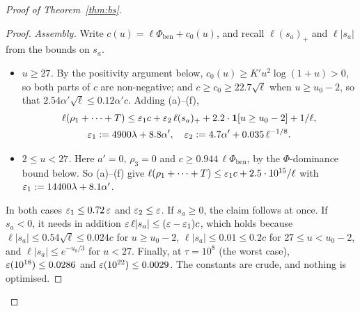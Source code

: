 \begin{proof}[Proof of Theorem~\ref{thm:bs}]
\begin{proof}
\emph{Assembly.} Write $c(u)=\ell\Phi_{\mathrm{ben}}+c_0(u)$, and recall $\ell(s_a)_+$ and $\ell|s_a|$ from the bounds on $s_a$.
\begin{itemize}
\item \emph{$u\ge27$.} By the positivity argument below, $c_0(u)\ge K'u^2\log(1+u)>0$, so both parts of $c$ are
  non-negative; and $c\ge c_0\ge22.7\sqrt\ell$ when $u\ge u_0-2$, so that $2.54\alpha'\sqrt\ell\le0.12\alpha'c$. Adding (a)--(f),
  \begin{gather*}
    \ell(\rho_1+\cdots+T)\le\varepsilon_1c+\varepsilon_2\,\ell(s_a)_++2.2\cdot\mathbf 1[u\ge u_0-2]+1/\ell,\\
    \varepsilon_1:=4900\lambda+8.8\alpha',\quad\varepsilon_2:=4.7\alpha'+0.035\,\ell^{-1/8}.
  \end{gather*}
\item \emph{$2\le u<27$.} Here $a'=0$, $\rho_3=0$ and $c\ge0.944\,\ell\Phi_{\mathrm{ben}}$, by the $\Phi$-dominance bound below. So
  (a)--(f) give $\ell(\rho_1+\cdots+T)\le\varepsilon_1c+2.5\cdot10^{15}/\ell$ with $\varepsilon_1:=14400\lambda+8.1\alpha'$.
\end{itemize}
In both cases $\varepsilon_1\le0.72\,\varepsilon$ and $\varepsilon_2\le\varepsilon$. If $s_a\ge0$, the claim follows at once. If $s_a<0$, it needs in
addition $\varepsilon\,\ell|s_a|\le(\varepsilon-\varepsilon_1)c$, which holds because $\ell|s_a|\le0.54\sqrt\ell\le0.024c$ for $u\ge u_0-2$,
$\ell|s_a|\le0.01\le0.2c$ for $27\le u<u_0-2$, and $\ell|s_a|\le e^{-u_0/3}$ for $u<27$. Finally, at $\tau=10^8$ (the worst
case), $\varepsilon(10^{18})\le0.0286$ and $\varepsilon(10^{22})\le0.0029$. The constants are crude, and nothing is optimised.
\end{proof}


\end{proof}
